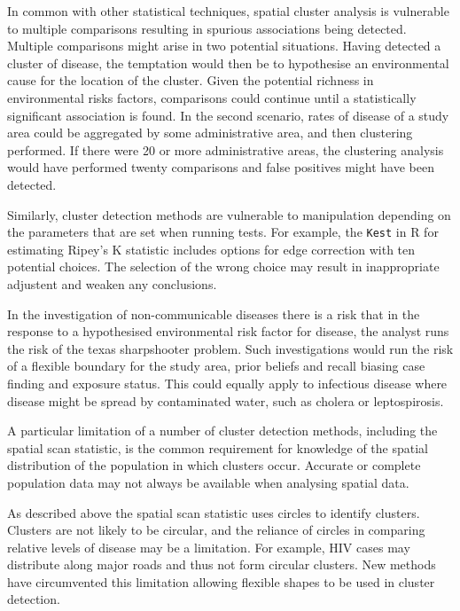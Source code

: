 \documentclass[11pt,a4paper]{article}
\begin{document}
In common with other statistical techniques, spatial cluster analysis is vulnerable to  multiple comparisons resulting in spurious associations being detected. \cite{Olsen1996}
Multiple comparisons might arise in two potential situations. 
Having detected a cluster of disease, the temptation would then be to hypothesise an environmental cause for the location of the cluster. 
Given the potential richness in environmental risks factors, comparisons could continue until a statistically significant association is found. 
In the second scenario, rates of disease of a study area could be aggregated by some administrative area, and then clustering performed. 
If there were 20 or more administrative areas, the clustering analysis would have performed twenty comparisons and false positives might have been detected. 

Similarly, cluster detection methods are vulnerable to manipulation depending on the parameters that are set when running tests.
For example, the \texttt{Kest} in R for estimating Ripey's K statistic includes options for edge correction with ten potential choices. 
The selection of the wrong choice may result in inappropriate adjustent and weaken any conclusions. 

In the investigation of non-communicable diseases there is a risk that in the response to a hypothesised environmental risk factor for disease, the analyst runs the risk of the texas sharpshooter problem. \cite{Rothman1990}\cite{Elliott2004}
Such investigations would run the risk of a flexible boundary for the study area, prior beliefs and recall biasing case finding and exposure status. 
This could equally apply to infectious disease where disease might be spread by contaminated water, such as cholera or leptospirosis. 

A particular limitation of a number of cluster detection methods, including the spatial scan statistic, is the common requirement for knowledge of the spatial distribution of the population in which clusters occur. \cite{Kulldorff1995}
Accurate or complete population data may not always be available when analysing spatial data.

As described above the spatial scan statistic uses circles to identify clusters. 
Clusters are not likely to be circular, and the reliance of circles in comparing relative levels of disease may be a limitation. 
For example, HIV cases may distribute along major roads and thus not form circular clusters.\cite{Tatem2012} 
New methods have circumvented this limitation allowing flexible shapes to be used in cluster detection. \cite{Tango2005}
\end{document}
